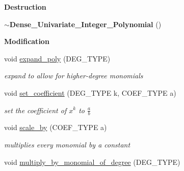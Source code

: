 \begin{Indent}\textbf{ Destruction}\par
\begin{DoxyCompactItemize}
\item 
\mbox{\label{class_dense___univariate___integer___polynomial_a9fb7da639b0155c4b6c5b2ee4e3f89fa}} 
{\bfseries $\sim$\+Dense\+\_\+\+Univariate\+\_\+\+Integer\+\_\+\+Polynomial} ()
\end{DoxyCompactItemize}
\end{Indent}
\begin{Indent}\textbf{ Modification}\par
\begin{DoxyCompactItemize}
\item 
void \hyperlink{class_dense___univariate___integer___polynomial_a58fc0f5eefa5d11cdd17d3453eb9ac0d}{expand\+\_\+poly} (D\+E\+G\+\_\+\+T\+Y\+PE)
\begin{DoxyCompactList}\small\item\em expand to allow for higher-\/degree monomials \end{DoxyCompactList}\item 
\mbox{\label{class_dense___univariate___integer___polynomial_a132de1284f006ae6e943c50e8fdee973}} 
void \hyperlink{class_dense___univariate___integer___polynomial_a132de1284f006ae6e943c50e8fdee973}{set\+\_\+coefficient} (D\+E\+G\+\_\+\+T\+Y\+PE k, C\+O\+E\+F\+\_\+\+T\+Y\+PE a)
\begin{DoxyCompactList}\small\item\em set the coefficient of $x^k$ to $\frac{a}{b}$ \end{DoxyCompactList}\item 
\mbox{\label{class_dense___univariate___integer___polynomial_a0e56525a2b24c37a6a43c2175b9b6178}} 
void \hyperlink{class_dense___univariate___integer___polynomial_a0e56525a2b24c37a6a43c2175b9b6178}{scale\+\_\+by} (C\+O\+E\+F\+\_\+\+T\+Y\+PE a)
\begin{DoxyCompactList}\small\item\em multiplies every monomial by a constant \end{DoxyCompactList}\item 
void \hyperlink{class_dense___univariate___integer___polynomial_a984a6d80cc0182348e20c60f20e4e180}{multiply\+\_\+by\+\_\+monomial\+\_\+of\+\_\+degree} (D\+E\+G\+\_\+\+T\+Y\+PE)

\end{DoxyCompactItemize}
\end{Indent}
